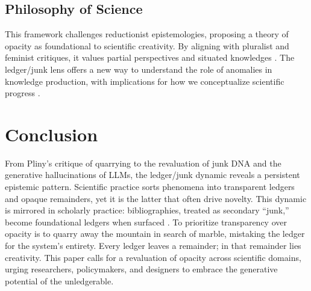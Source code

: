 \documentclass[11pt]{article}
\begin{document}
\subsection{Philosophy of Science}
This framework challenges reductionist epistemologies, proposing a theory of opacity as foundational to scientific creativity. By aligning with pluralist and feminist critiques, it values partial perspectives and situated knowledges \citep{feyerabend1975, haraway1988}. The ledger/junk lens offers a new way to understand the role of anomalies in knowledge production, with implications for how we conceptualize scientific progress \citep{hacking1983, barad2007, bachelard1984}.

\section{Conclusion}

From Pliny’s critique of quarrying to the revaluation of junk DNA and the generative hallucinations of LLMs, the ledger/junk dynamic reveals a persistent epistemic pattern. Scientific practice sorts phenomena into transparent ledgers and opaque remainders, yet it is the latter that often drive novelty. This dynamic is mirrored in scholarly practice: bibliographies, treated as secondary ``junk,'' become foundational ledgers when surfaced \citep{rheinberger1997, star1989}. To prioritize transparency over opacity is to quarry away the mountain in search of marble, mistaking the ledger for the system’s entirety. Every ledger leaves a remainder; in that remainder lies creativity. This paper calls for a revaluation of opacity across scientific domains, urging researchers, policymakers, and designers to embrace the generative potential of the unledgerable.

\newpage

\end{document}
